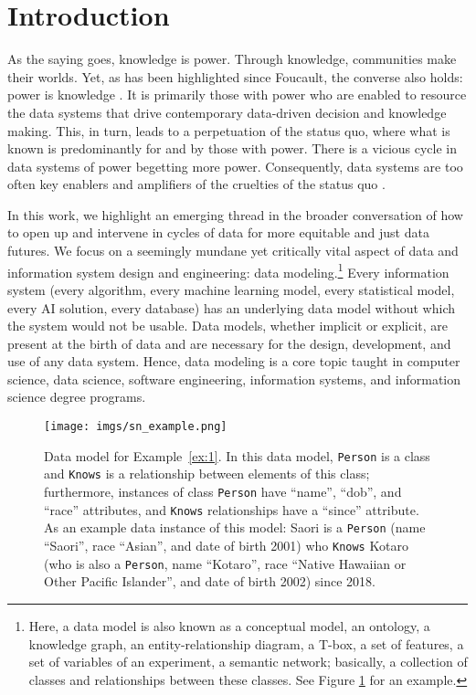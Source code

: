 \section{Introduction}
\label{sec:intro}

As the saying goes, knowledge is power.  Through knowledge, communities make their worlds.  Yet, as has been highlighted since Foucault, the converse also holds: power is knowledge \cite{foucault}. It is primarily those with power who are enabled to resource the data systems that drive contemporary data-driven decision and knowledge making.  This, in turn, leads to a perpetuation of the status quo, where what is known is predominantly for and by those with power.  There is a vicious cycle in data systems of power begetting more power.  Consequently, data systems are too often key enablers and amplifiers of the cruelties of the status quo \cite{ansorge,becker,benjamin,bode,costanza,couldry,eubanks,stevens,LewinskiBS24,biopower,weizenbaum}.

In this work, we highlight an emerging thread in the broader conversation of how to open up and intervene in cycles of data for more equitable and just data futures.  We focus on a seemingly mundane yet critically vital aspect of data and information system design and engineering: data modeling.\footnote{Here, a data model is also known as a conceptual model, an ontology, a knowledge graph, an entity-relationship diagram, a T-box, a set of features, a set of variables of an experiment, a semantic network; basically, a collection of classes and relationships between these classes. See Figure \ref{fig:example} for an example.}  Every information system (every algorithm, every machine learning model, every statistical model, every AI solution, every database) has an underlying data model without which the system would not be usable.  Data models, whether implicit or explicit, are present at the birth of data and are necessary for the design, development, and use of any data system. Hence, data modeling is a core topic taught in computer science, data science, software engineering, information systems, and information science degree programs.

\begin{figure}
    \centering
    \texttt{[image: imgs/sn\_example.png]}
    \caption{Data model for Example~\ref{ex:1}.
   In this data model, \texttt{Person} is a class and \texttt{Knows} is a relationship between elements of this class; furthermore, instances of class \texttt{Person} have ``name'', ``dob'',  and ``race''  attributes, and \texttt{Knows} relationships have a ``since'' attribute. 
    As an example data instance of this model: Saori is a \texttt{Person} (name ``Saori'', race ``Asian'', and date of birth 2001) who \texttt{Knows} Kotaro (who is also a \texttt{Person}, name ``Kotaro'', race ``Native Hawaiian or Other Pacific Islander'', and date of birth 2002) since 2018.    }
    \label{fig:example}
\end{figure}

